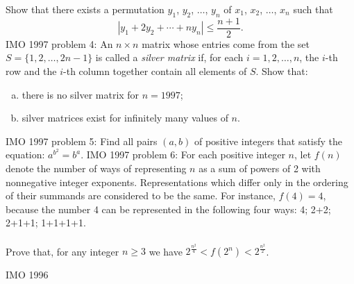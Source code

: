 Show that there exists a permutation   $ y_1$, $ y_2$, $ \ldots$, $ y_n$  of $ x_1$, $ x_2$, $ \ldots$, $ x_n$  such that
\[ | y_1 + 2 y_2 + \cdots + n y_n | \leq \frac {n + 1}{2}. \] 
IMO 1997 problem 4:  An $ n \times n$ matrix whose entries come from the set $ S = \{1, 2, \ldots , 2n - 1\}$ is called a \textit{silver matrix} if, for each $ i = 1, 2, \ldots , n$, the $ i$-th row and the $ i$-th column together contain all elements of $ S$. Show that:
\begin{enumerate}[(a)]
  \item there is no silver matrix for $ n = 1997$;
  \item silver matrices exist for infinitely many values of $ n$.
\end{enumerate} 
IMO 1997 problem 5:  Find all pairs $ (a,b)$ of positive integers that satisfy the equation: $ a^{b^2} = b^a$. 
IMO 1997 problem 6:  For each positive integer $ n$, let $ f(n)$ denote the number of ways of representing $ n$ as a sum of powers of 2 with nonnegative integer exponents. Representations which differ only in the ordering of their summands are considered to be the same. For instance, $ f(4) = 4$, because the number 4 can be represented in the following four ways: 4; 2+2; 2+1+1; 1+1+1+1. \\\\
Prove that, for any integer $ n \geq 3$ we have $ 2^{\frac {n^2}{4}} < f(2^n) < 2^{\frac {n^2}2}$. 

IMO 1996 

